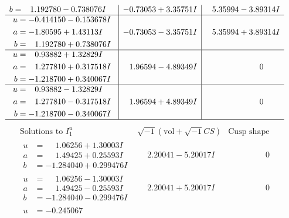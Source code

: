 \documentclass[1p]{elsarticle_modified}
\theoremstyle{definition}
\newcommand{\I}{\sqrt{-1}}
\begin{document}
$$\begin{array}{c|c|c}
\begin{aligned}
b &= \phantom{-}1.192780 - 0.738076 I\end{aligned}
 & -0.73053 + 3.35751 I & \phantom{-}5.35994 - 3.89314 I \\ \hline\begin{aligned}
u &= -0.414150 - 0.153678 I \\
a &= -1.80595 + 1.43113 I \\
b &= \phantom{-}1.192780 + 0.738076 I\end{aligned}
 & -0.73053 - 3.35751 I & \phantom{-}5.35994 + 3.89314 I \\ \hline\begin{aligned}
u &= \phantom{-}0.93882 + 1.32829 I \\
a &= \phantom{-}1.277810 + 0.317518 I \\
b &= -1.218700 + 0.340067 I\end{aligned}
 & \phantom{-}1.96594 - 4.89349 I & \phantom{-0.000000 } 0 \\ \hline\begin{aligned}
u &= \phantom{-}0.93882 - 1.32829 I \\
a &= \phantom{-}1.277810 - 0.317518 I \\
b &= -1.218700 - 0.340067 I\end{aligned}
 & \phantom{-}1.96594 + 4.89349 I & \phantom{-0.000000 } 0\\
 \hline 
 \end{array}$$\newpage$$\begin{array}{c|c|c}  
\text{Solutions to }I^u_{1}& \I (\text{vol} + \sqrt{-1}CS) & \text{Cusp shape}\\
 \hline 
\begin{aligned}
u &= \phantom{-}1.06256 + 1.30003 I \\
a &= \phantom{-}1.49425 + 0.25593 I \\
b &= -1.284040 + 0.299476 I\end{aligned}
 & \phantom{-}2.20041 - 5.20017 I & \phantom{-0.000000 } 0 \\ \hline\begin{aligned}
u &= \phantom{-}1.06256 - 1.30003 I \\
a &= \phantom{-}1.49425 - 0.25593 I \\
b &= -1.284040 - 0.299476 I\end{aligned}
 & \phantom{-}2.20041 + 5.20017 I & \phantom{-0.000000 } 0 \\ \hline\begin{aligned}
u &= -0.245067\phantom{ +0.000000I} \\

\end{aligned}
\end{array}$$
\end{document}
